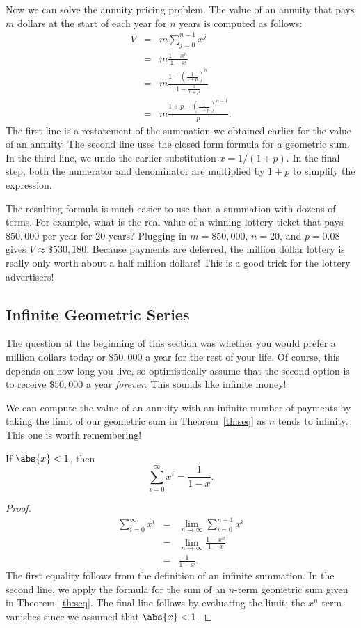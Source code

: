 Now we can solve the annuity pricing problem.  The value of an annuity
that pays $m$ dollars at the start of each year for $n$ years is
computed as follows:
\begin{eqnarray*}
V & = & m \sum_{j=0}^{n-1} x^j \\
  & = & m \frac{1 - x^n}{1 - x} \\
  & = & m \frac{1 - (\frac{1}{1+p})^n}{1 - \frac{1}{1+p}} \\
  & = & m \frac{1 + p - (\frac{1}{1+p})^{n-1}}{p}.
\end{eqnarray*}
The first line is a restatement of the summation we obtained earlier for
the value of an annuity.  The second line uses the closed form formula for
a geometric sum.  In the third line, we undo the earlier substitution $x =
1/(1+p)$.  In the final step, both the numerator and denominator are
multiplied by $1 + p$ to simplify the expression.

The resulting formula is much easier to use than a summation with
dozens of terms.  For example, what is the real value of a winning
lottery ticket that pays $\$50,000$ per year for 20 years?  Plugging
in $m = \$50,000$, $n = 20$, and $p = 0.08$ gives $V \approx
\$530,180$.  Because payments are deferred, the million dollar lottery
is really only worth about a half million dollars!  This is a good
trick for the lottery advertisers!


\subsection{Infinite Geometric Series}

The question at the beginning of this section was whether you would
prefer a million dollars today or $\$50,000$ a year for the rest of
your life.  Of course, this depends on how long you live, so
optimistically assume that the second option is to receive $\$50,000$
a year {\em forever}.  This sounds like infinite money!

We can compute the value of an annuity with an infinite number of
payments by taking the limit of our geometric sum in
Theorem~\ref{th:seq} as $n$ tends to infinity.  This one is worth
remembering!

\begin{theorem}
\label{th:series}
If $\abs{x} < 1$, then
\[
\sum_{i=0}^\infty x^i = \frac{1}{1-x}.
\]
\end{theorem}

\begin{proof}
\begin{eqnarray*}
\sum_{i=0}^\infty x^i & = & \lim_{n \rightarrow \infty} \sum_{i=0}^{n-1} x^i \\
                      & = & \lim_{n \rightarrow \infty} \frac{1 - x^n}{1-x} \\
                      & = & \frac{1}{1-x}.
\end{eqnarray*}
The first equality follows from the definition of an infinite
summation.  In the second line, we apply the formula for the sum of an
$n$-term geometric sum given in Theorem~\ref{th:seq}.  The final
line follows by evaluating the limit; the $x^n$ term vanishes since we
assumed that $\abs{x} < 1$.
\end{proof}

